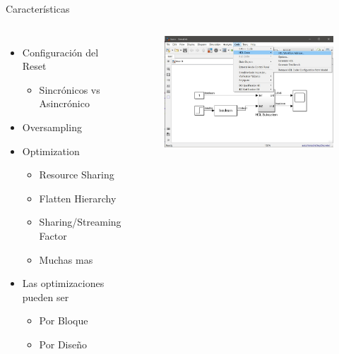 \documentclass{beamer}
\begin{document}
\begin{frame}{Características}
\begin{columns}
\begin{itemize}
	\item Configuración del Reset
	\begin{itemize}
		\item Sincrónicos vs Asincrónico
	\end{itemize}
	\item Oversampling
	\item Optimization
	\begin{itemize}
		\item Resource Sharing
		\item Flatten Hierarchy
		\item Sharing/Streaming Factor 
		\item Muchas mas
	\end{itemize}
	\item Las optimizaciones pueden ser
	\begin{itemize}
		\item Por Bloque
		\item Por Diseño
	\end{itemize}
\end{itemize}
\begin{figure}
	\includegraphics[page=6, width=\textwidth]{figs/figs.pdf}
\end{figure}
\end{columns}
\end{frame}
\end{document}
